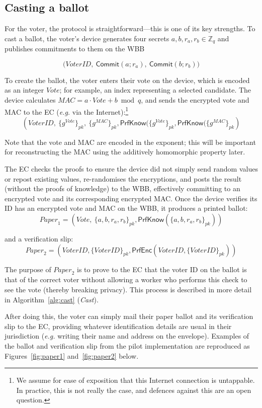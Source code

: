 \documentclass[12pt,a4paper]{article}
\newcommand{\commit}{\mathsf{Commit}}
\newcommand{\PrfEnc}{\mathsf{PrfEnc}}
\newcommand{\PrfKnow}{\mathsf{PrfKnow}}
\theoremstyle{definition}
\newcommand{\Vote}{\mathit{Vote}}
\newcommand{\VoterID}{\mathit{VoterID}}
\newcommand{\Paper}{\mathit{Paper}}
\newcommand{\Mac}{\mathit{MAC}}
\newcommand{\eg}{\textit{e.g. }}
\begin{document}
\subsection{Casting a ballot}\label{sec:cast-ballot}
For the voter, the protocol is straightforward---this is one of its key strengths. To cast a ballot, the voter's device generates four secrets $a, b, r_a, r_b \in \mathbb{Z}_q$ and publishes commitments to them on the WBB

$$\big(\VoterID,\ \commit(a;r_a),\ \commit(b;r_b)\big)$$

To create the ballot, the voter enters their vote on the device, which is encoded as an integer $\Vote$; for example, an index representing a selected candidate. The device calculates $\Mac=a\cdot \Vote+b \bmod q$, and sends the encrypted vote and MAC to the EC (\eg via the Internet):\footnote{We assume for ease of exposition that this Internet connection is untappable. In practice, this is not really the case, and defences against this are an open question.}
$$\left(\VoterID,\ \{g^{\Vote}\}_{pk},\ \{g^\Mac\}_{pk}, \PrfKnow(\{g^{\Vote}\}_{pk}, \PrfKnow(\{g^{\Mac}\}_{pk}\right)$$

Note that the vote and MAC are encoded in the exponent; this will be important for reconstructing the MAC using the additively homomorphic property later.

The EC checks the proofs to ensure the device did not simply send random values or repost existing values, re-randomises the encryptions, and posts the result (without the proofs of knowledge) to the WBB, effectively committing to an encrypted vote and its corresponding encrypted MAC. Once the device verifies its ID has an encrypted vote and MAC on the WBB, it produces a printed ballot:
$$\Paper_1 = \left(\Vote,\ \{a,b,r_a,r_b\}_{pk}, \PrfKnow(\{a,b,r_a,r_b\}_{pk})\right)$$

and a verification slip:
$$\Paper_2 = \left(\VoterID, \{\VoterID\}_{pk}, \PrfEnc(\VoterID, \{\VoterID\}_{pk})\right)$$

The purpose of $\Paper_2$ is to prove to the EC that the voter ID on the ballot is that of the correct voter without allowing a worker who performs this check to see the vote (thereby breaking privacy). This process is described in more detail in Algorithm~\ref{alg:cast} (\textit{Cast}).

After doing this, the voter can simply mail their paper ballot and its verification slip to the EC, providing whatever identification details are usual in their jurisdiction (\eg writing their name and address on the envelope). Examples of the ballot and verification slip from the pilot implementation are reproduced as Figures~\ref{fig:paper1} and~\ref{fig:paper2} below.
\end{document}
